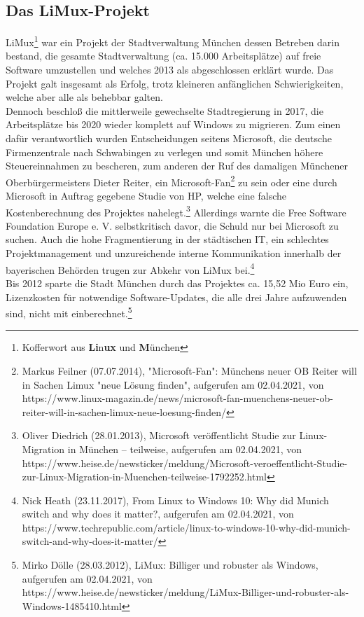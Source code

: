 \subsection{Das LiMux-Projekt}
\glqq LiMux\grqq\footnote{Kofferwort aus \textbf{Li}n\textbf{ux} und \textbf{M}ünchen} war ein Projekt der Stadtverwaltung München dessen Betreben darin bestand, die gesamte Stadtverwaltung (ca. 15.000 Arbeitsplätze) auf freie Software umzustellen und welches 2013 als abgeschlossen erklärt wurde. Das Projekt galt insgesamt als Erfolg, trotz kleineren anfänglichen Schwierigkeiten, welche aber alle als behebbar galten.\\
Dennoch beschloß die mittlerweile gewechselte Stadtregierung in 2017, die Arbeitsplätze bis 2020 wieder komplett auf Windows zu migrieren. Zum einen dafür verantwortlich wurden Entscheidungen seitens Microsoft, die deutsche Firmenzentrale nach Schwabingen zu verlegen und somit München höhere Steuereinnahmen zu bescheren, zum anderen der Ruf des damaligen Münchener Oberbürgermeisters Dieter Reiter, ein \glqq Microsoft-Fan\grqq{}\footnote{Markus Feilner (07.07.2014), "Microsoft-Fan": Münchens neuer OB Reiter will in Sachen Limux "neue Lösung finden", aufgerufen am 02.04.2021, von https://www.linux-magazin.de/news/microsoft-fan-muenchens-neuer-ob-reiter-will-in-sachen-limux-neue-loesung-finden/} zu sein oder eine durch Microsoft in Auftrag gegebene Studie von HP, welche eine falsche Kostenberechnung des Projektes nahelegt.\footnote{Oliver Diedrich (28.01.2013), Microsoft veröffentlicht Studie zur Linux-Migration in München – teilweise, aufgerufen am 02.04.2021, von https://www.heise.de/newsticker/meldung/Microsoft-veroeffentlicht-Studie-zur-Linux-Migration-in-Muenchen-teilweise-1792252.html} Allerdings warnte die \glqq Free Software Foundation Europe e. V.\grqq{} selbstkritisch davor, die Schuld nur bei Microsoft zu suchen. Auch die hohe Fragmentierung in der städtischen IT, ein schlechtes Projektmanagement und unzureichende interne Kommunikation innerhalb der bayerischen Behörden trugen zur Abkehr von LiMux bei.\footnote{Nick Heath (23.11.2017), From Linux to Windows 10: Why did Munich switch and why does it matter?, aufgerufen am 02.04.2021, von https://www.techrepublic.com/article/linux-to-windows-10-why-did-munich-switch-and-why-does-it-matter/}\\
Bis 2012 sparte die Stadt München durch das Projektes ca. 15,52 Mio Euro ein, Lizenzkosten für notwendige Software-Updates, die alle drei Jahre aufzuwenden sind, nicht mit einberechnet.\footnote{Mirko Dölle (28.03.2012), LiMux: Billiger und robuster als Windows, aufgerufen am 02.04.2021, von https://www.heise.de/newsticker/meldung/LiMux-Billiger-und-robuster-als-Windows-1485410.html}
\vfill